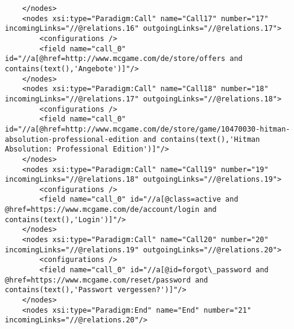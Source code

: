 \begin{lstlisting}
	</nodes>
	<nodes xsi:type="Paradigm:Call" name="Call17" number="17" incomingLinks="//@relations.16" outgoingLinks="//@relations.17">
		<configurations />
		<field name="call_0" id="//a[@href=http://www.mcgame.com/de/store/offers and contains(text(),'Angebote')]"/>
	</nodes>
	<nodes xsi:type="Paradigm:Call" name="Call18" number="18" incomingLinks="//@relations.17" outgoingLinks="//@relations.18">
		<configurations />
		<field name="call_0" id="//a[@href=http://www.mcgame.com/de/store/game/10470030-hitman-absolution-professional-edition and contains(text(),'Hitman Absolution: Professional Edition')]"/>
	</nodes>
	<nodes xsi:type="Paradigm:Call" name="Call19" number="19" incomingLinks="//@relations.18" outgoingLinks="//@relations.19">
		<configurations />
		<field name="call_0" id="//a[@class=active and @href=https://www.mcgame.com/de/account/login and contains(text(),'Login')]"/>
	</nodes>
	<nodes xsi:type="Paradigm:Call" name="Call20" number="20" incomingLinks="//@relations.19" outgoingLinks="//@relations.20">
		<configurations />
		<field name="call_0" id="//a[@id=forgot\_password and @href=https://www.mcgame.com/reset/password and contains(text(),'Passwort vergessen?')]"/>
	</nodes>
	<nodes xsi:type="Paradigm:End" name="End" number="21" incomingLinks="//@relations.20"/>


\end{lstlisting}

